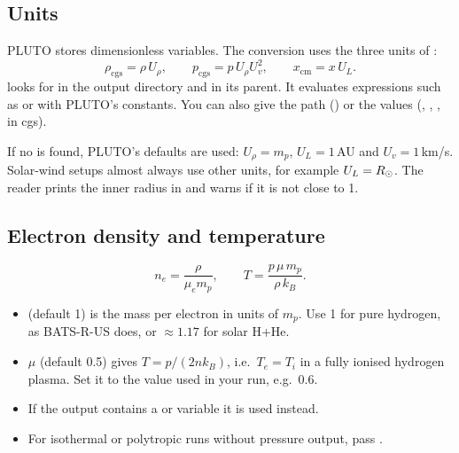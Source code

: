\subsection*{Units}
PLUTO stores dimensionless variables. The conversion uses the three units of
:
\[
  \rho_\text{cgs}=\rho\,U_\rho,\qquad
  p_\text{cgs}=p\,U_\rho U_v^2,\qquad
  x_\text{cm}=x\,U_L .
\]
 looks for  in the output directory and in its
parent. It evaluates expressions such as  or 
with PLUTO's constants. You can also give the path () or the
values (, , , in cgs).

\begin{warn}
If no  is found, PLUTO's defaults are used:
$U_\rho=m_p$, $U_L=1$\,AU and $U_v=1$\,km/s. Solar-wind setups almost always use
other units, for example $U_L=R_\odot$. The reader prints the inner radius in \rsun{} and
warns if it is not close to 1.
\end{warn}

\subsection*{Electron density and temperature}
\[
  n_e=\frac{\rho}{\mu_e m_p},\qquad
  T=\frac{p\,\mu\,m_p}{\rho\,k_B}.
\]
\begin{itemize}[itemsep=1pt]
\item {} (default 1) is the mass per electron in units of $m_p$. Use 1 for
      pure hydrogen, as BATS-R-US does, or $\approx1.17$ for solar H+He.
\item {} $\mu$ (default 0.5) gives $T=p/(2n k_B)$, i.e.\
      $T_e=T_i$ in a fully ionised hydrogen plasma. Set it to the value used in your
      run, e.g.\ 0.6.
\item If the output contains a  or  variable it is used instead.
\item For isothermal or polytropic runs without pressure output, pass .
\end{itemize}

